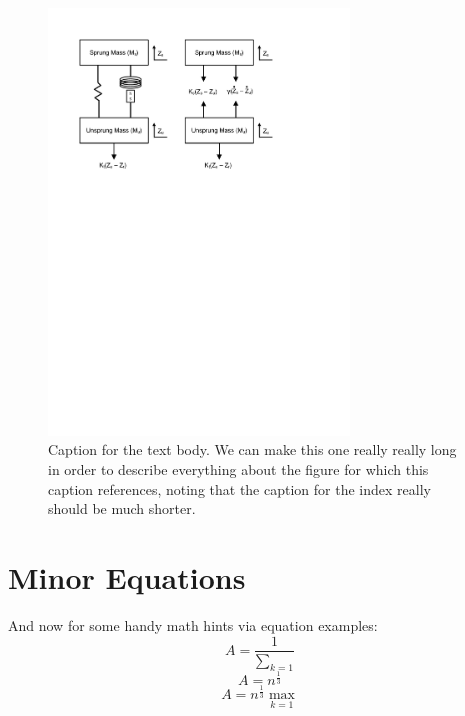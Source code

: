 \begin{figure}[H]
    \begin{singlespace}
        \centering
        \includegraphics[width=8cm]{Figures/FBD.pdf}
        \caption[Caption for the List of Figures.]{Caption for the text body. We can
            make this one really really long in order to describe everything
            about the figure for which this caption references, noting that
            the caption for the index really should be much shorter.}
        \label{fig:example}
    \end{singlespace}
\end{figure}

\section{Minor Equations}
And now for some handy math hints via equation examples:
\begin{equation}
    A=\frac{1}{\displaystyle\sum_{k=1}^{}}
\end{equation}
\begin{equation}
    A=n^{\frac{1}{3}}
\end{equation}
\begin{equation}
    A=n^{\frac{1}{3}}\max_{k=1}
\end{equation}

